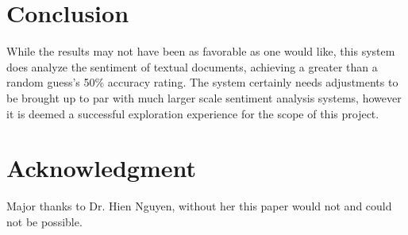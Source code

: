 \section{Conclusion}
While the results may not have been as favorable as one would like, this system does analyze the sentiment of textual documents, achieving a greater than a random guess's 50\% accuracy rating. The system certainly needs adjustments to be brought up to par with much larger scale sentiment analysis systems, however it is deemed a successful exploration experience for the scope of this project.

\section{Acknowledgment}
Major thanks to Dr. Hien Nguyen, without her this paper would not and could not be possible.

